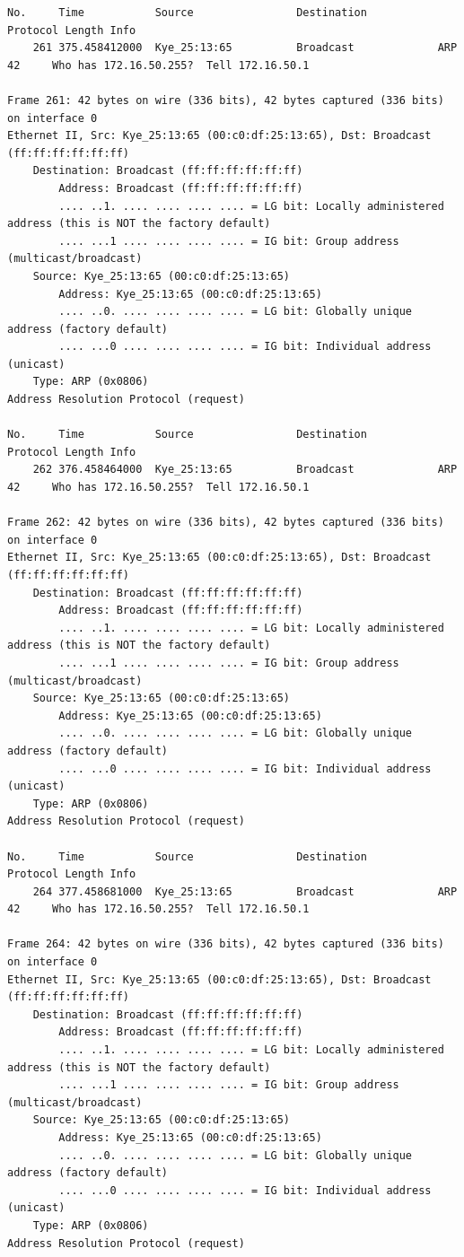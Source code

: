 \documentclass[a4paper,11pt]{article}
\begin{document}
\begin{lstlisting}
No.     Time           Source                Destination           Protocol Length Info
    261 375.458412000  Kye_25:13:65          Broadcast             ARP      42     Who has 172.16.50.255?  Tell 172.16.50.1

Frame 261: 42 bytes on wire (336 bits), 42 bytes captured (336 bits) on interface 0
Ethernet II, Src: Kye_25:13:65 (00:c0:df:25:13:65), Dst: Broadcast (ff:ff:ff:ff:ff:ff)
    Destination: Broadcast (ff:ff:ff:ff:ff:ff)
        Address: Broadcast (ff:ff:ff:ff:ff:ff)
        .... ..1. .... .... .... .... = LG bit: Locally administered address (this is NOT the factory default)
        .... ...1 .... .... .... .... = IG bit: Group address (multicast/broadcast)
    Source: Kye_25:13:65 (00:c0:df:25:13:65)
        Address: Kye_25:13:65 (00:c0:df:25:13:65)
        .... ..0. .... .... .... .... = LG bit: Globally unique address (factory default)
        .... ...0 .... .... .... .... = IG bit: Individual address (unicast)
    Type: ARP (0x0806)
Address Resolution Protocol (request)

No.     Time           Source                Destination           Protocol Length Info
    262 376.458464000  Kye_25:13:65          Broadcast             ARP      42     Who has 172.16.50.255?  Tell 172.16.50.1

Frame 262: 42 bytes on wire (336 bits), 42 bytes captured (336 bits) on interface 0
Ethernet II, Src: Kye_25:13:65 (00:c0:df:25:13:65), Dst: Broadcast (ff:ff:ff:ff:ff:ff)
    Destination: Broadcast (ff:ff:ff:ff:ff:ff)
        Address: Broadcast (ff:ff:ff:ff:ff:ff)
        .... ..1. .... .... .... .... = LG bit: Locally administered address (this is NOT the factory default)
        .... ...1 .... .... .... .... = IG bit: Group address (multicast/broadcast)
    Source: Kye_25:13:65 (00:c0:df:25:13:65)
        Address: Kye_25:13:65 (00:c0:df:25:13:65)
        .... ..0. .... .... .... .... = LG bit: Globally unique address (factory default)
        .... ...0 .... .... .... .... = IG bit: Individual address (unicast)
    Type: ARP (0x0806)
Address Resolution Protocol (request)

No.     Time           Source                Destination           Protocol Length Info
    264 377.458681000  Kye_25:13:65          Broadcast             ARP      42     Who has 172.16.50.255?  Tell 172.16.50.1

Frame 264: 42 bytes on wire (336 bits), 42 bytes captured (336 bits) on interface 0
Ethernet II, Src: Kye_25:13:65 (00:c0:df:25:13:65), Dst: Broadcast (ff:ff:ff:ff:ff:ff)
    Destination: Broadcast (ff:ff:ff:ff:ff:ff)
        Address: Broadcast (ff:ff:ff:ff:ff:ff)
        .... ..1. .... .... .... .... = LG bit: Locally administered address (this is NOT the factory default)
        .... ...1 .... .... .... .... = IG bit: Group address (multicast/broadcast)
    Source: Kye_25:13:65 (00:c0:df:25:13:65)
        Address: Kye_25:13:65 (00:c0:df:25:13:65)
        .... ..0. .... .... .... .... = LG bit: Globally unique address (factory default)
        .... ...0 .... .... .... .... = IG bit: Individual address (unicast)
    Type: ARP (0x0806)
Address Resolution Protocol (request)


\end{lstlisting}
\end{document}
